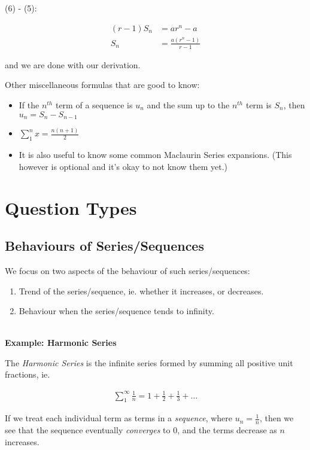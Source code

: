 \documentclass[12pt, a4paper, titlepage]{article}
\begin{document}
(6) - (5):

\begin{align}
    (r-1)S_n &= ar^n - a \\
    S_n &= \frac{a(r^n - 1)}{r - 1}
\end{align}

and we are done with our derivation.

Other miscellaneous formulas that are good to know:

\begin{itemize}
    \item If the $n^{th}$ term of a sequence is $u_n$ and the sum up to the $n^{th}$ term is $S_n$, then $u_n = S_n - S_{n-1}$
    \item $\sum_{1}^{n} x = \frac{n(n+1)}{2}$
    \item It is also useful to know some common Maclaurin Series expansions. (This however is optional and it's okay to not know them yet.) 
\end{itemize}

\section{Question Types}

\subsection{Behaviours of Series/Sequences}

We focus on two aspects of the behaviour of such series/sequences:

\begin{enumerate}
    \item Trend of the series/sequence, ie. whether it increases, or decreases.
    \item Behaviour when the series/sequence tends to infinity.
\end{enumerate}

\textbf{\\ Example: Harmonic Series}

The \emph{Harmonic Series} is the infinite series formed by summing all positive unit fractions, ie.

\begin{align*}
    \sum_1^{\infty} \frac{1}{n} = 1 + \frac{1}{2} + \frac{1}{3} + \dots
\end{align*}

If we treat each individual term as terms in a \emph{sequence}, where $u_n = \frac{1}{n}$, then we see that the sequence eventually \emph{converges} to $0$, and the terms decrease as $n$ increases.
\end{document}
